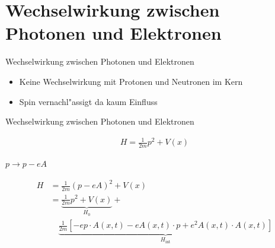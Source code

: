 \documentclass{beamer}
\begin{document}

\section{Wechselwirkung zwischen Photonen und Elektronen}
\begin{frame}[t]{Wechselwirkung zwischen Photonen und Elektronen}
	\vspace*{-0.5cm}
	\begin{center}
		\begin{itemize}
			\item Keine Wechselwirkung mit Protonen und Neutronen im Kern
			\item Spin vernachl"assigt da kaum Einfluss
		\end{itemize}
	\end{center}
\end{frame}

\begin{frame}[t]{Wechselwirkung zwischen Photonen und Elektronen}
	\vspace*{-0.5cm}
	\begin{center}
		
		\begin{minipage}{0.35\textwidth}
			\begin{align*}
			H = \frac{1}{2m}p^2 + V(x)
			\end{align*}
		\end{minipage}
		
		\vspace*{0.5cm}
		
		$p \rightarrow p-eA$
		
		\begin{minipage}{0.35\textwidth}
			\begin{align*}
			H &= \frac{1}{2m}(p - eA)^2 + V(x)\\
			&= \underbrace{\frac{1}{2m}p^2 + V(x)}_{H_0} + \\
			 & \quad \underbrace{\frac{1}{2m}\left[- e p \cdot A(x, t) - e A(x, t) \cdot p + e^2 A(x, t) \cdot A(x, t) \right]}_{H_{\text{int}}}
			\end{align*}
		\end{minipage}
	\end{center}
\end{frame}
\end{document}

